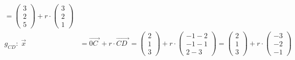 \begin{exercise}
\begin{equation*}
\begin{split}
    =
    \begin{pmatrix}
      \num{3} \\
      \num{2} \\
      \num{5}
    \end{pmatrix}
    +r\cdot
    \begin{pmatrix}
      \num{3} \\
      \num{2} \\
      \num{1}
    \end{pmatrix}
    \\[1ex]
    g_{CD}:\;\vec{x}
    &=\overrightarrow{0C\;}+r\cdot\overrightarrow{CD\;}
    =
    \begin{pmatrix}
      \num{2} \\
      \num{1} \\
      \num{3}
    \end{pmatrix}
    +r\cdot
    \begin{pmatrix}
      -\num{1} - \num{2} \\
      -\num{1} - \num{1} \\
      \num{2} - \num{3}
    \end{pmatrix}
    =
    \begin{pmatrix}
      \num{2} \\
      \num{1} \\
      \num{3}
    \end{pmatrix}
    +r\cdot
    \begin{pmatrix}
      -\num{3} \\
      -\num{2} \\
      -\num{1}
    \end{pmatrix}
    \end{split}
    \end{equation*}


\end{exercise}

